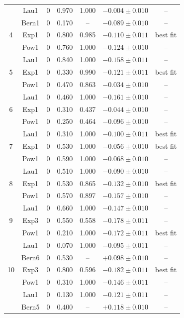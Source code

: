 \begin{table}[htbp]
\begin{center}
{\begin{tabular}{|c|c|c|c|c|c|c|}
       & Lau1 & 0 & 0.970 & 1.000 & $-0.004 \pm 0.010$ & -- \\
       & Bern1 & 0 & 0.170 & -- & $-0.089 \pm 0.010$ & -- \\
      \hline
      4 & Exp1 & 0 & 0.800 & 0.985 & $-0.110 \pm 0.011$ & best fit \\
       & Pow1 & 0 & 0.760 & 1.000 & $-0.124 \pm 0.010$ & -- \\
       & Lau1 & 0 & 0.840 & 1.000 & $-0.158 \pm 0.011$ & -- \\
      \hline
      5 & Exp1 & 0 & 0.330 & 0.990 & $-0.121 \pm 0.011$ & best fit \\
       & Pow1 & 0 & 0.470 & 0.863 & $-0.034 \pm 0.010$ & -- \\
       & Lau1 & 0 & 0.460 & 1.000 & $-0.161 \pm 0.010$ & -- \\
      \hline
      6 & Exp1 & 0 & 0.310 & 0.437 & $-0.044 \pm 0.010$ & -- \\
       & Pow1 & 0 & 0.250 & 0.464 & $-0.096 \pm 0.010$ & -- \\
       & Lau1 & 0 & 0.310 & 1.000 & $-0.100 \pm 0.011$ & best fit \\
      \hline
      7 & Exp1 & 0 & 0.530 & 1.000 & $-0.056 \pm 0.010$ & best fit \\
       & Pow1 & 0 & 0.590 & 1.000 & $-0.068 \pm 0.010$ & -- \\
       & Lau1 & 0 & 0.510 & 1.000 & $-0.090 \pm 0.010$ & -- \\
      \hline
      8 & Exp1 & 0 & 0.530 & 0.865 & $-0.132 \pm 0.010$ & best fit \\
       & Pow1 & 0 & 0.570 & 0.897 & $-0.157 \pm 0.010$ & -- \\
       & Lau1 & 0 & 0.660 & 1.000 & $-0.147 \pm 0.010$ & -- \\
      \hline
      9 & Exp3 & 0 & 0.550 & 0.558 & $-0.178 \pm 0.011$ & -- \\
       & Pow1 & 0 & 0.210 & 1.000 & $-0.172 \pm 0.011$ & best fit \\
       & Lau1 & 0 & 0.070 & 1.000 & $-0.095 \pm 0.011$ & -- \\
       & Bern6 & 0 & 0.530 & -- & $+0.098 \pm 0.010$ & -- \\
      \hline
      10 & Exp3 & 0 & 0.800 & 0.596 & $-0.182 \pm 0.011$ & best fit \\
       & Pow1 & 0 & 0.310 & 1.000 & $-0.146 \pm 0.011$ & -- \\
       & Lau1 & 0 & 0.130 & 1.000 & $-0.121 \pm 0.011$ & -- \\
       & Bern5 & 0 & 0.400 & -- & $+0.118 \pm 0.010$ & -- \\
      \hline
    \end{tabular}
    }
  \end{center}
\end{table}
